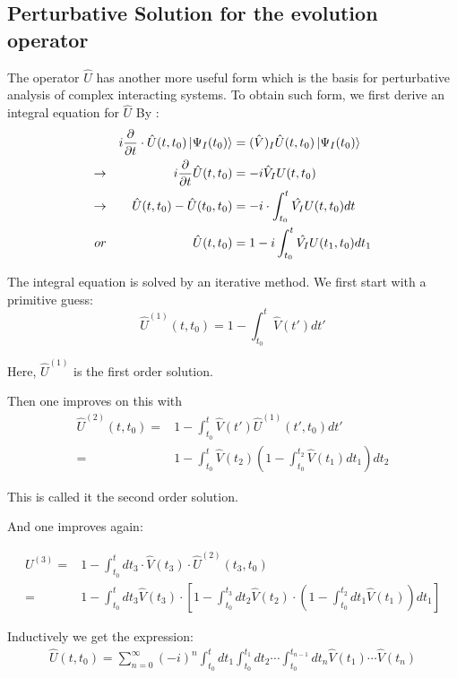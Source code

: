 \documentclass{article}
\numberwithin{equation}{subsection} %
\begin{document}
	\subsection{Perturbative Solution for the evolution operator}
	
	The operator $\hat{U}$ has another more useful form which is the basis for perturbative analysis of complex interacting systems. To obtain such form, we first derive an integral equation for $\hat{U}$
	By :
	\begin{align}
		&&	i\frac{\partial}{\partial t} \cdot \hat{U}(t,t_0) \ket{\Psi_I(t_0)} &= (\hat{V})_I \hat{U}(t,t_0) \ket{\Psi_I(t_0)} 
		\\
		\rightarrow& 	&i\frac{\partial}{\partial t} \hat{U}(t,t_0) &= -i \hat{V}_I U(t,t_0)
		\\
		\rightarrow& 	&\hat{U}(t,t_0) - \hat{U}(t_0,t_0) &= -i \cdot \int_{t_0}^{t}\hat{V_I} U(t,t_0) dt
		\\
		or&		
		\label{eq:int_eq_4U} &\hat{U}(t,t_0) &= 1- i \int_{t_0}^{t} \hat{V_I} U(t_1,t_0) dt_1		
	\end{align}
	
	The integral equation is solved by an iterative method.
	We first start with a primitive guess:
	$$\hat{U}^{(1)}(t,t_0) = 1- \int_{t_0}^{t} \hat{V}(t')dt'$$
	
	Here, $\hat{U}^{(1)}$ is the first order solution.
	
	Then one improves on this with
	\begin{align}
		\hat{U}^{(2)} (t,t_0) =& 1- \int_{t_0}^{t} \hat{V}(t') \hat{U}^{(1)}(t',t_0) dt'
		\\
		=& 1- \int_{t_0}^{t} \hat{V}(t_2)  (1-\int_{t_0}^{t_2} \hat{V}(t_1)dt_1) dt_2
	\end{align}

	This is called it the second order solution.

	And one improves again:

	\begin{align}
	    U^{(3)}	=& 1- \int_{t_0}^{t} dt_3 \cdot \hat{V}(t_3) \cdot \hat{U}^{(2)}(t_3, t_0)
	    \\
	    =& 1- \int_{t_0}^{t} dt_3 \hat{V}(t_3) \cdot [ 1- \int_{t_0}^{t_3} dt_2 \hat{V}(t_2) \cdot
	    (1- \int_{t_0}^{t_2}dt_1 \hat{V}(t_1))dt_1]	
	\end{align}

    Inductively we get the expression:
    \begin{align}
    	\hat{U}(t,t_0) = \sum_{n=0}^{\infty}
    		(-i)^n
    		\int_{t_0}^{t} dt_1 \int_{t_0}^{t_1} dt_2
    		\dotsb \int_{t_0}^{t_{n-1}} dt_n
    		\hat{V}(t_1)\dotsb\hat{V}(t_{n})
    \end{align}
\end{document}
